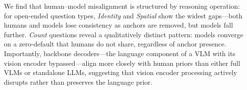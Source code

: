 We find that human--model misalignment is structured by reasoning operation:
for open-ended question types, \textit{Identity} and \textit{Spatial} show the widest gaps---both humans and models lose consistency as anchors are removed, but models fall further.
\textit{Count} questions reveal a qualitatively distinct pattern: models converge on a
zero-default that humans do not share, regardless of anchor presence.
Importantly, backbone decoders---the language component of a VLM with its vision
encoder bypassed---align more closely with human priors than either full VLMs or
standalone LLMs, suggesting that vision encoder processing actively disrupts rather than
preserves the language prior.

